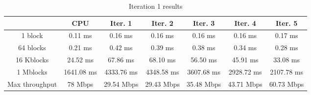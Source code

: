 \begin{table}
	\caption{Iteration 1 results}
	\centering
	\begin{tabular}{ccccccc}
		\toprule
		 & CPU & Iter. 1 & Iter. 2 & Iter. 3 & Iter. 4 & Iter. 5 \\
		\midrule
		1 block & 0.11 ms & 0.16 ms & 0.16 ms & 0.16 ms & 0.16 ms & 0.17 ms \\
		64 blocks & 0.21 ms & 0.42 ms & 0.39 ms & 0.38 ms & 0.34 ms & 0.28 ms \\
		16 Kblocks & 24.52 ms & 67.86 ms & 68.10 ms & 56.50 ms & 45.91 ms & 33.08 ms \\
		1 Mblocks & 1641.08 ms & 4333.76 ms & 4348.58 ms & 3607.68 ms & 2928.72 ms & 2107.78 ms \\
		Max throughput & 78 Mbps & 29.54 Mbps & 29.43 Mbps & 35.48 Mbps & 43.71 Mbps & 60.73 Mbps \\
		\bottomrule
	\end{tabular}
\end{table}

